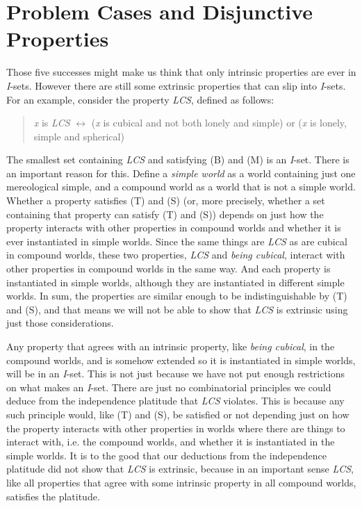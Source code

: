 \section{Problem Cases and Disjunctive Properties}
Those five successes might make us think that only intrinsic properties are ever in \textit{I}\nobreakdash-sets. However there are still some extrinsic properties that can slip into \textit{I}\nobreakdash-sets. For an example, consider the property \textit{LCS}, defined as follows: 

\begin{quote}
\textit{x} is \textit{LCS} ${\leftrightarrow}$ (\textit{x} is cubical and not both lonely and simple) or (\textit{x} is lonely, simple and spherical)
\end{quote}

\noindent The smallest set containing \textit{LCS} and satisfying (B) and (M) is an \textit{I}\nobreakdash-set. There is an important reason for this. Define a \textit{simple world} as a world containing just one mereological simple, and a compound world as a world that is not a simple world. Whether a property satisfies (T) and (S) (or, more precisely, whether a set containing that property can satisfy (T) and (S)) depends on just how the property interacts with other properties in compound worlds and whether it is ever instantiated in simple worlds. Since the same things are \textit{LCS} as are cubical in compound worlds, these two properties, \textit{LCS} and \textit{being cubical}, interact with other properties in compound worlds in the same way. And each property is instantiated in simple worlds, although they are instantiated in different simple worlds. In sum, the properties are similar enough to be indistinguishable by (T) and (S), and that means we will not be able to show that \textit{LCS} is extrinsic using just those considerations. 

Any property that agrees with an intrinsic property, like \textit{being cubical}, in the compound worlds, and is somehow extended so it is instantiated in simple worlds, will be in an \textit{I}\nobreakdash-set. This is not just because we have not put enough restrictions on what makes an \textit{I}\nobreakdash-set. There are just no combinatorial principles we could deduce from the independence platitude that \textit{LCS} violates. This is because any such principle would, like (T) and (S), be satisfied or not depending just on how the property interacts with other properties in worlds where there are things to interact with, i.e. the compound worlds, and whether it is instantiated in the simple worlds. It is to the good that our deductions from the independence platitude did not show that \textit{LCS} is extrinsic, because in an important sense \textit{LCS}, like all properties that agree with some intrinsic property in all compound worlds,\textit{ }satisfies the platitude.

